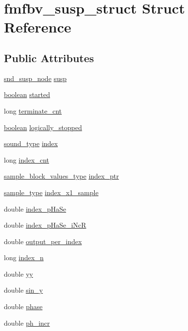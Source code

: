 \hypertarget{structfmfbv__susp__struct}{}\section{fmfbv\+\_\+susp\+\_\+struct Struct Reference}
\label{structfmfbv__susp__struct}
\subsection*{Public Attributes}
\begin{DoxyCompactItemize}
\item 
\hyperlink{sound_8h_a6b268203688a934bd798ceb55f85d4c0}{snd\+\_\+susp\+\_\+node} \hyperlink{structfmfbv__susp__struct_adb3e7c3ecfda07368a19599534351c57}{susp}
\item 
\hyperlink{cext_8h_a7670a4e8a07d9ebb00411948b0bbf86d}{boolean} \hyperlink{structfmfbv__susp__struct_a42707442763d495e3cb626b33a064e27}{started}
\item 
long \hyperlink{structfmfbv__susp__struct_a99e597b41911e4075373587d6f675569}{terminate\+\_\+cnt}
\item 
\hyperlink{cext_8h_a7670a4e8a07d9ebb00411948b0bbf86d}{boolean} \hyperlink{structfmfbv__susp__struct_a9307bf1cf670bf7fa11a7f42f674cdbf}{logically\+\_\+stopped}
\item 
\hyperlink{sound_8h_a792cec4ed9d6d636d342d9365ba265ea}{sound\+\_\+type} \hyperlink{structfmfbv__susp__struct_a001af995c72790aad5a1e5cf75c85286}{index}
\item 
long \hyperlink{structfmfbv__susp__struct_aa5aebe19152079f09f909233b814f7b2}{index\+\_\+cnt}
\item 
\hyperlink{sound_8h_a83d17f7b465d1591f27cd28fc5eb8a03}{sample\+\_\+block\+\_\+values\+\_\+type} \hyperlink{structfmfbv__susp__struct_aaf70f690bcbd68cfc7a2a03ea508c969}{index\+\_\+ptr}
\item 
\hyperlink{sound_8h_a3a9d1d4a1c153390d2401a6e9f71b32c}{sample\+\_\+type} \hyperlink{structfmfbv__susp__struct_a6970c3b7b1824fd09514ded85c92fd02}{index\+\_\+x1\+\_\+sample}
\item 
double \hyperlink{structfmfbv__susp__struct_a6341b71fe95abe59c173b8a9cfc9fbff}{index\+\_\+p\+Ha\+Se}
\item 
double \hyperlink{structfmfbv__susp__struct_ad582617ee96483604820d22f6d31bde6}{index\+\_\+p\+Ha\+Se\+\_\+i\+NcR}
\item 
double \hyperlink{structfmfbv__susp__struct_a3798c00c3248a599b9cf341f925e6239}{output\+\_\+per\+\_\+index}
\item 
long \hyperlink{structfmfbv__susp__struct_a8f299c777ed1975920ae8e7dc28e0174}{index\+\_\+n}
\item 
double \hyperlink{structfmfbv__susp__struct_ada0725aabc8aedea453ef9aef52ec5bd}{yy}
\item 
double \hyperlink{structfmfbv__susp__struct_ae781e4bc475bf80ec415d94d83548a9d}{sin\+\_\+y}
\item 
double \hyperlink{structfmfbv__susp__struct_af844358625a3c4d32e44a3ebdf71dee6}{phase}
\item 
double \hyperlink{structfmfbv__susp__struct_ad8731c667c9968e918f24388f01364dc}{ph\+\_\+incr}
\end{DoxyCompactItemize}


